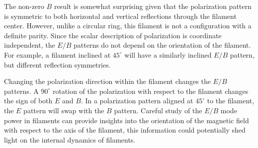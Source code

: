 \documentclass[a4paper,11pt]{article}
\begin{document}
The non-zero $B$ result is somewhat surprising given that the polarization pattern is symmetric to both horizontal and vertical reflections through the filament center.  However, unlike a circular ring, this filament is not a configuration with a definite parity.  Since the scalar description of polarization is coordinate independent, the $E/B$ patterns do not depend on the orientation of the filament.  For example, a filament inclined at $45^\circ$ will have a similarly inclined $E/B$ pattern, but different reflection symmetries.  

 Changing the polarization direction within the filament changes the $E/B$ patterns.  A $90^\circ$ rotation of the polarization with respect to the filament changes the sign of both $E$ and $B$.  In a polarization pattern aligned at $45^\circ$ to the filament, the $E$ pattern will swap with the $B$ pattern.  Careful study of the $E/B$ mode power in filaments can provide insights into the orientation of the magnetic field with respect to the axis of the filament, this information could potentially shed light on the internal dynamics of filaments.
% 
\end{document}
